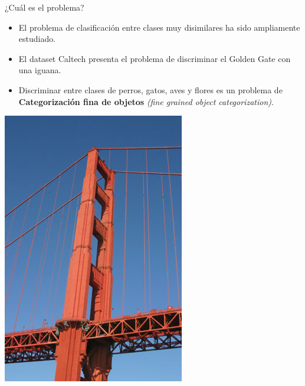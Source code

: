 \documentclass{beamer}
\begin{document}
	\begin{frame}{¿Cuál es el problema?}
		\begin{itemize}
			\item{
				El problema de clasificación entre clases muy disimilares ha sido ampliamente estudiado.
			}
			\item{
				El dataset Caltech presenta el problema de discriminar el Golden Gate con una iguana.
			}
			\item{
				Discriminar entre clases de perros, gatos, aves y flores es un problema de \textbf{Categorización fina de objetos} \textit{(fine  grained  object  categorization)}.
			}
		\end{itemize}
        \begin{center}
            {\includegraphics[scale=0.2]{imagen/ggate.jpg}}

\end{center}
\end{frame}
\end{document}
